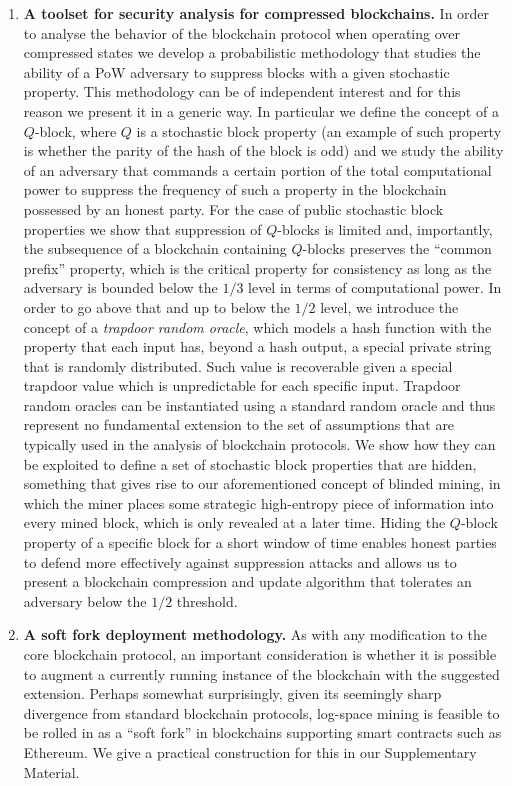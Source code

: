 \begin{enumerate}[wide, labelwidth=!, labelindent=0pt, label=(\roman*)]
  \item\textbf{A toolset for security analysis for compressed blockchains.}
In order to analyse the behavior of the blockchain protocol
when operating over compressed states we develop a probabilistic
methodology that studies the ability of a PoW adversary
to suppress blocks with a given stochastic property.
This methodology can be of independent interest and for this reason we present
it in a generic way. In particular we define the concept of a $Q$-block,
where $Q$ is a stochastic block property (an example of such property
is whether the parity of the hash of the block is odd)
and we study the ability of an adversary that commands a certain
portion of the total computational power to suppress the frequency of such a
property in the blockchain possessed by an honest party.
For the case of public stochastic block properties we show that
suppression of $Q$-blocks is limited and, importantly,
the subsequence of a blockchain containing $Q$-blocks preserves
the ``common prefix'' property, which is the critical property
for consistency as long as the adversary is bounded below
the $1/3$ level in terms of computational power.
In order to go above that and up to below the $1/2$ level,
we introduce the concept of a \emph{trapdoor random oracle},
which models a hash function with the property that each input
has, beyond a hash output, a special private string that is
randomly distributed. Such value is recoverable given a special
trapdoor value which is unpredictable for each specific input.
Trapdoor random oracles can be instantiated using a standard
random oracle and thus represent no fundamental extension to the
set of assumptions that are typically used in the analysis
of blockchain protocols. We show how they can be exploited
to define a set of stochastic block properties that are
hidden, something that gives rise to our aforementioned
concept of blinded mining, in which the miner places
some strategic high-entropy piece of information into every mined block, which
is only revealed at a later time.
Hiding
the $Q$-block property of a specific block
for a short window of time
enables honest parties
to defend more effectively against suppression attacks and allows
us to present a blockchain compression and update algorithm that
tolerates an adversary below the $1/2$ threshold.

\item\textbf{A soft fork deployment methodology.}
As with any modification
to the core blockchain protocol, an important consideration is whether
it is possible to augment  a currently running instance of the
blockchain with the suggested extension. Perhaps somewhat surprisingly,
given its seemingly sharp divergence from standard blockchain
protocols, log-space mining is feasible to be rolled in
as a ``soft fork'' in blockchains supporting smart contracts such as Ethereum.
We give a practical construction for this in our
Supplementary Material.
\end{enumerate}
